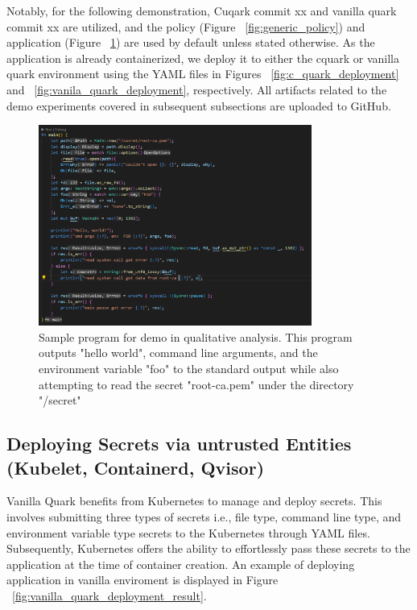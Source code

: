Notably, for the following demonstration, Cuqark commit xx and vanilla quark commit xx are utilized, and the policy (Figure ~\ref{fig:generic_policy}) and application (Figure ~\ref{fig:analysis_workload}) are used by default unless stated otherwise. As the application is already containerized, 
we deploy it to either the cquark or vanilla quark environment using the YAML files in Figures ~\ref{fig:c_quark_deployment} and ~\ref{fig:vanila_quark_deployment}, respectively.  All artifacts related to the demo experiments covered in subsequent subsections are uploaded to GitHub.



\begin{figure}[H]
    \centering
    \includegraphics[width=0.8\textwidth]{images/analysis_workload.PNG}
    \caption[Sample program for demo in qualitative analysis]{Sample program for demo in qualitative analysis. This program outputs "hello world", command line arguments, and the environment variable "foo" to the standard output while also attempting to read the secret "root-ca.pem" under the directory "/secret"}
    \label{fig:analysis_workload}
\end{figure}



\subsection{Deploying Secrets via untrusted Entities (Kubelet, Containerd, Qvisor)}


Vanilla Quark benefits from Kubernetes to manage and deploy secrets. This involves submitting three types of secrets i.e., file type, command line type, and environment variable type secrets to the Kubernetes through YAML files. Subsequently, Kubernetes offers the ability to effortlessly pass 
these secrets to the application at the time of container creation.  An example of deploying application in vanilla enviroment is displayed in Figure ~\ref{fig:vanilla_quark_deployment_result}.

